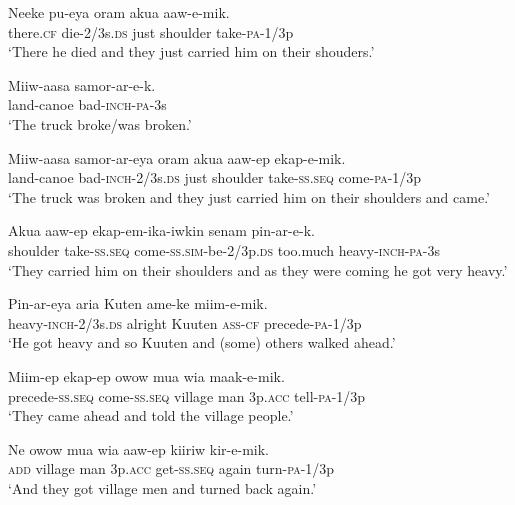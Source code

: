 {\ea\label{ex:a:x39}
\gll  Neeke  pu-eya  oram  akua  aaw-e-mik. \\
there.\textsc{cf}  die-2/3s.\textsc{ds}  just  shoulder  take-\textsc{pa}-1/3p \\
\glt ‘There he died and they just carried him on their shouders.’ \\
\z


\ea\label{ex:a:x40}
\gll  Miiw-aasa  samor-ar-e-k. \\
land-canoe  bad-\textsc{inch}-\textsc{pa}-3s \\
\glt ‘The truck broke/was broken.’ \\
\z


\ea\label{ex:a:x41}
\gll  Miiw-aasa  samor-ar-eya  oram  akua  aaw-ep  ekap-e-mik. \\
land-canoe  bad-\textsc{inch}-2/3s.\textsc{ds}  just  shoulder  take-\textsc{ss.seq}  come-\textsc{pa}-1/3p \\
\glt ‘The truck was broken and they just carried him on their shoulders and came.’ \\
\z


\ea\label{ex:a:x42}
\gll  Akua  aaw-ep  ekap-em-ika-iwkin  senam             pin-ar-e-k. \\
shoulder  take-\textsc{ss.seq}  come-\textsc{ss}.\textsc{sim}-be-2/3p.\textsc{ds}  too.much  heavy-\textsc{inch}-\textsc{pa}-3s \\


\glt ‘They carried him on their shoulders and as they were coming he got very heavy.’ \\
\z


\ea\label{ex:a:x43}
\gll  Pin-ar-eya  aria  Kuten  ame-ke  miim-e-mik. \\
heavy-\textsc{inch}-2/3s.\textsc{ds}  alright  Kuuten  \textsc{ass}-\textsc{cf}  precede-\textsc{pa}-1/3p \\
\glt ‘He got heavy and so Kuuten and (some) others walked ahead.’ \\
\z


\ea\label{ex:a:x44}
\gll  Miim-ep  ekap-ep  owow  mua  wia  maak-e-mik. \\
precede-\textsc{ss.seq}  come-\textsc{ss.seq}  village  man  3p.\textsc{acc}  tell-\textsc{pa}-1/3p \\
\glt ‘They came ahead and told the village people.’ \\
\z


\ea\label{ex:a:x45}
\gll  Ne  owow  mua  wia  aaw-ep  kiiriw  kir-e-mik. \\
\textsc{add}  village  man  3p.\textsc{acc}  get-\textsc{ss.seq}  again  turn-\textsc{pa}-1/3p \\
\glt ‘And they got village men and turned back again.’ \\
\z


}
